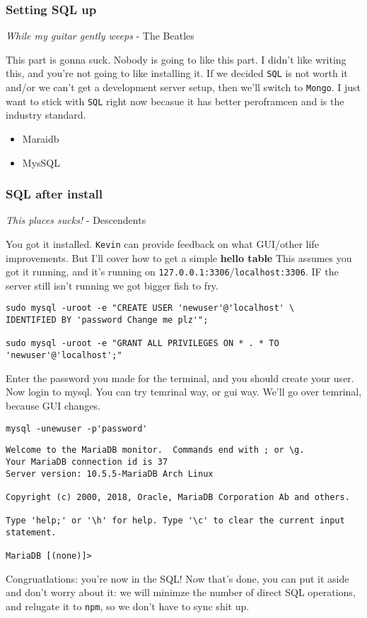 \documentclass[11pt]{article}
\begin{document}
\subsubsection*{Setting SQL up}
\label{sec:orgb1c818d}
\begin{center}
\emph{While my guitar gently weeps} - The Beatles
\end{center}
This part is gonna suck. Nobody is going to like this part. I didn't like writing this, and you're not going to like installing it. If we decided \texttt{SQL} is not worth it and/or we can't get a development server setup, then we'll switch to \texttt{Mongo}. I just want to stick with \texttt{SQL} right now becasue it has better peroframcen and is the industry standard.


\begin{itemize}
\item Maraidb
\item MysSQL
\end{itemize}

\subsubsection*{SQL after install}
\label{sec:org16a2fc5}
\begin{center}
\emph{This places sucks!} - Descendents
\end{center}
You got it installed. \texttt{Kevin} can provide feedback on what GUI/other life improvements. But I'll cover how to get a simple \textbf{hello table}
This assumes you got it running, and it's running on \texttt{127.0.0.1:3306}​/​\texttt{localhost:3306}. IF the server still isn't running we got bigger fish to fry.

\begin{verbatim}
sudo mysql -uroot -e "CREATE USER 'newuser'@'localhost' \
IDENTIFIED BY 'password Change me plz'";

sudo mysql -uroot -e "GRANT ALL PRIVILEGES ON * . * TO 'newuser'@'localhost';"

\end{verbatim}
Enter the password you made for the terminal, and you should create your user. Now login to mysql. You can try temrinal way, or gui way. We'll go over temrinal, because GUI changes.

\begin{verbatim}
mysql -unewuser -p'password'
\end{verbatim}

\begin{verbatim}
Welcome to the MariaDB monitor.  Commands end with ; or \g.
Your MariaDB connection id is 37
Server version: 10.5.5-MariaDB Arch Linux

Copyright (c) 2000, 2018, Oracle, MariaDB Corporation Ab and others.

Type 'help;' or '\h' for help. Type '\c' to clear the current input statement.

MariaDB [(none)]> 
\end{verbatim}
Congruatlations: you're now in the SQL! Now that's done, you can put it aside and don't worry about it: we will minimze the number of direct SQL operations, and relugate it to \texttt{npm}, so we don't have to sync shit up.
\end{document}
